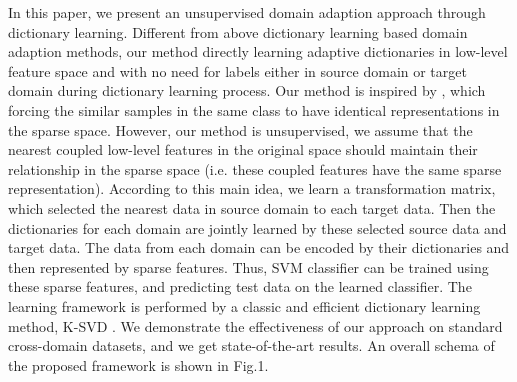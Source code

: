 \documentclass{article}
\begin{document}
In this paper, we present an unsupervised domain adaption approach through dictionary learning. Different from above dictionary learning based domain adaption methods, our method directly learning adaptive dictionaries in low-level feature space and with no need for labels either in source domain or target domain during dictionary learning process. Our method is inspired by \cite{zhu2013enhancing,zhu2014weakly}, which forcing the similar samples in the same class to have identical representations in the sparse space. However, our method is unsupervised, we assume that the nearest coupled low-level features in the original space should maintain their relationship in the sparse space (i.e. these coupled features have the same sparse representation).  According to this main idea, we learn a transformation matrix, which selected the nearest data in source domain to each target data. Then the dictionaries for each domain are jointly learned by these selected source data and target data. The data from each domain can be encoded by their dictionaries and then represented by sparse features. Thus, SVM classifier can be trained using these sparse features, and predicting test data on the learned classifier. The learning framework is performed by a classic and efficient dictionary learning method, K-SVD \cite{aharon2006svd}. We demonstrate the effectiveness of our approach on standard cross-domain datasets, and we get state-of-the-art results.  An overall schema of the proposed framework is shown in Fig.1.





\end{document}
